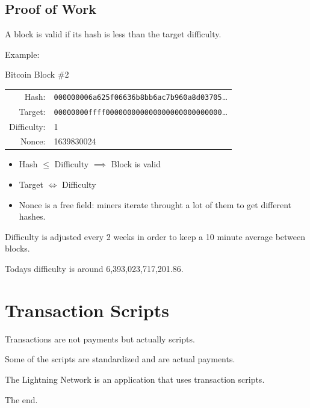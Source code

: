 \documentclass{beamer}
\begin{document}
\subsection{Proof of Work}
\begin{frame}
    A block is valid if its hash is less than the target difficulty.

    \pause
    Example:
    \begin{block}{Bitcoin Block \#2}
        \begin{tabular}{ r l }
            Hash: &   \texttt{000000006a625f06636b8bb6ac7b960a8d03705}\ldots \\
            Target: & \texttt{00000000ffff000000000000000000000000000}\ldots \\
            Difficulty: & 1 \\
            Nonce: & 1639830024
        \end{tabular}
    \end{block}

    \pause
    \begin{itemize}
        \item Hash $\leq$ Difficulty $\implies$ Block is valid
        \item Target $\iff$ Difficulty
        \item Nonce is a free field: miners iterate throught a lot of them to
            get different hashes.
    \end{itemize}

    \pause
    Difficulty is adjusted every 2 weeks in order to keep a 10 minute average
    between blocks.

    \pause
    Todays difficulty is around 6,393,023,717,201.86.
\end{frame}

\section{Transaction Scripts}
\begin{frame}
    Transactions are not payments \pause but actually scripts.

    \pause
    Some of the scripts are standardized and are actual payments.

    \pause
    The Lightning Network is an application that uses transaction scripts.
\end{frame}
\begin{frame}
    \begin{center}
        \huge{The end.}
    \end{center}
\end{frame}
\end{document}
